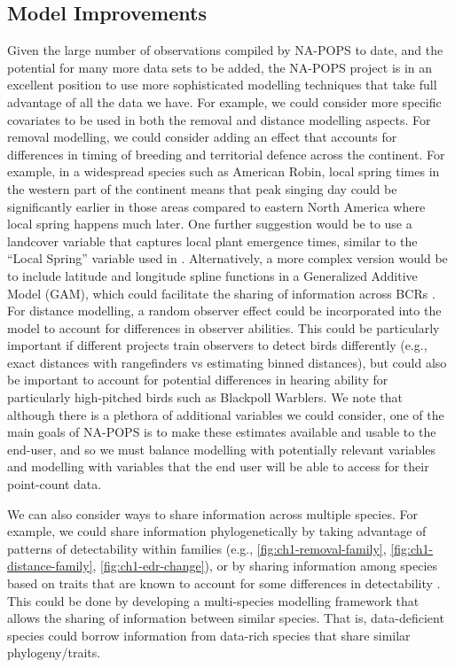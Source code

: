 \subsection{Model Improvements}
\par Given the large number of observations compiled by NA-POPS to date, and the potential for many more data sets to be added, the NA-POPS project is in an excellent position to use more sophisticated modelling techniques that take full advantage of all the data we have. For example, we could consider more specific covariates to be used in both the removal and distance modelling aspects. For removal modelling, we could consider adding an effect that accounts for differences in timing of breeding and territorial defence across the continent. For example, in a widespread species such as American Robin, local spring times in the western part of the continent means that peak singing day could be significantly earlier in those areas compared to eastern North America where local spring happens much later. One further suggestion would be to use a landcover variable that captures local plant emergence times, similar to the “Local Spring” variable used in \citet{solymos_evaluating_2018}. Alternatively, a more complex version would be to include latitude and longitude spline functions in a Generalized Additive Model (GAM), which could facilitate the sharing of information across BCRs \citep{crainiceanu_bayesian_2005, wood_generalized_2017, pedersen_hierarchical_2019}. For distance modelling, a random observer effect could be incorporated into the model to account for differences in observer abilities. This could be particularly important if different projects train observers to detect birds differently (e.g., exact distances with rangefinders vs estimating binned distances), but could also be important to account for potential differences in hearing ability for particularly high-pitched birds such as Blackpoll Warblers. We note that although there is a plethora of additional variables we could consider, one of the main goals of NA-POPS is to make these estimates available and usable to the end-user, and so we must balance modelling with potentially relevant variables and modelling with variables that the end user will be able to access for their point-count data.

\par We can also consider ways to share information across multiple species. For example, we could share information phylogenetically by taking advantage of patterns of detectability within families (e.g., \autoref{fig:ch1-removal-family}, \autoref{fig:ch1-distance-family}, \autoref{fig:ch1-edr-change}), or by sharing information among species based on traits that are known to account for some differences in detectability \citep{johnston_species_2014, solymos_phylogeny_2018}. This could be done by developing a multi-species modelling framework that allows the sharing of information between similar species. That is, data-deficient species could borrow information from data-rich species that share similar phylogeny/traits. 

